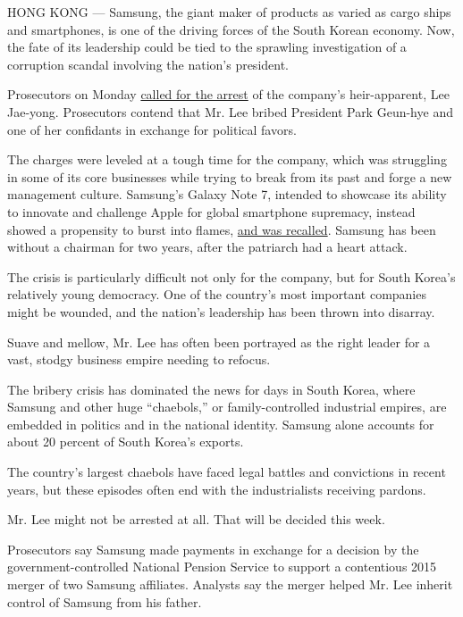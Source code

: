 HONG KONG --- Samsung, the giant maker of products as varied as cargo
ships and smartphones, is one of the driving forces of the South Korean
economy. Now, the fate of its leadership could be tied to the sprawling
investigation of a corruption scandal involving the nation's president.

Prosecutors on Monday
\href{https://www.nytimes.com/2017/01/15/world/asia/south-korea-samsung-arrest-jay-lee-park-geun-hye.html}{called
for the arrest} of the company's heir-apparent, Lee Jae-yong.
Prosecutors contend that Mr. Lee bribed President Park Geun-hye and one
of her confidants in exchange for political favors.

The charges were leveled at a tough time for the company, which was
struggling in some of its core businesses while trying to break from its
past and forge a new management culture. Samsung's Galaxy Note 7,
intended to showcase its ability to innovate and challenge Apple for
global smartphone supremacy, instead showed a propensity to burst into
flames,
\href{https://www.nytimes.com/2016/09/03/business/samsung-galaxy-note-battery.html}{and
was recalled}. Samsung has been without a chairman for two years, after
the patriarch had a heart attack.

The crisis is particularly difficult not only for the company, but for
South Korea's relatively young democracy. One of the country's most
important companies might be wounded, and the nation's leadership has
been thrown into disarray.

Suave and mellow, Mr. Lee has often been portrayed as the right leader
for a vast, stodgy business empire needing to refocus.

The bribery crisis has dominated the news for days in South Korea, where
Samsung and other huge ``chaebols,'' or family-controlled industrial
empires, are embedded in politics and in the national identity. Samsung
alone accounts for about 20 percent of South Korea's exports.

The country's largest chaebols have faced legal battles and convictions
in recent years, but these episodes often end with the industrialists
receiving pardons.

Mr. Lee might not be arrested at all. That will be decided this week.

Prosecutors say Samsung made payments in exchange for a decision by the
government-controlled National Pension Service to support a contentious
2015 merger of two Samsung affiliates. Analysts say the merger helped
Mr. Lee inherit control of Samsung from his father.

